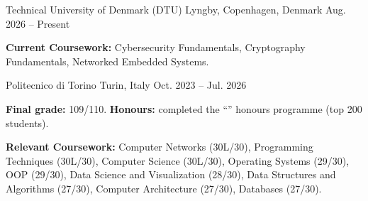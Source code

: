
\begin{cventries}

    {Technical University of Denmark (DTU)}
    {Lyngby, Copenhagen, Denmark}
    {Aug. 2026 -- Present}
    {
      \begin{cvitems}
        \item{\textbf{Current Coursework:} Cybersecurity Fundamentals, Cryptography Fundamentals, Networked Embedded Systems.}
      \end{cvitems}
    }

    {Politecnico di Torino}
    {Turin, Italy}
    {Oct. 2023 -- Jul. 2026}
    {
      \begin{cvitems}
        \item{\textbf{Final grade:} 109/110. \textbf{Honours:} completed the ``'' honours programme (top 200 students).}
        \item{\textbf{Relevant Coursework:} Computer Networks (30L/30), Programming Techniques (30L/30), Computer Science (30L/30), Operating Systems (29/30), OOP (29/30), Data Science and Visualization (28/30), Data Structures and Algorithms (27/30), Computer Architecture (27/30), Databases (27/30).}
      \end{cvitems}
    }

\end{cventries}
